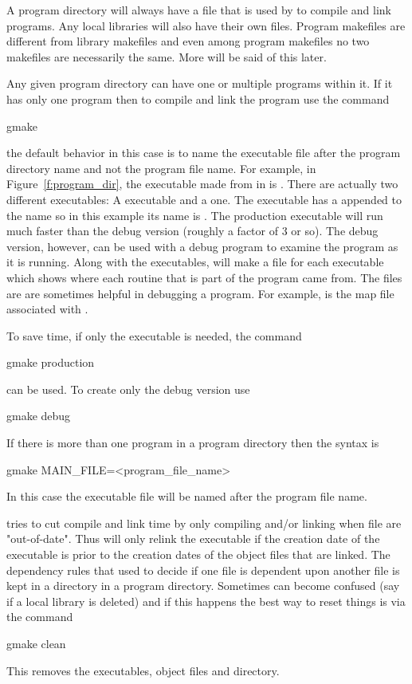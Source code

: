 A program directory will always have a  file that is used
by  to compile and link programs. Any local libraries will
also have their own  files. Program makefiles are
different from library makefiles and even among program makefiles no
two makefiles are necessarily the same. More will be said of this
later.

Any given program directory can have one or multiple programs within
it. If it has only one program then to compile and link the program
use the command
\begin{example}
  gmake
\end{example}
the default  behavior in this case is to name the executable
file after the program directory name and not the program file
name. For example, in Figure~\ref{f:program_dir}, the executable made from
 in  is . There
are actually two different executables: A  executable
and a  one. The  executable has a  appended
to the name so in this example its name is .
The production executable will run much faster than the debug version
(roughly a factor of 3 or so). The debug version, however, can be used
with a debug program to examine the program as it is running. Along
with the executables,  will make a  file for each
executable which shows where each routine that is part of the program
came from. The  files are are sometimes helpful in debugging
a program. For example,  is the map file
associated with .

To save time, if only the  executable is needed, the command
\begin{example}
  gmake production
\end{example}
can be used. To create only the debug version use
\begin{example}
  gmake debug
\end{example}
If there is more than one program in a program directory then the
 syntax is
\begin{example}
  gmake MAIN_FILE=<program_file_name>
\end{example}
In this case the executable file will be named after the program file
name.

 tries to cut compile and link time by only compiling and/or
linking when file are "out-of-date". Thus  will only relink
the executable if the creation date of the executable is prior to the
creation dates of the object files that are linked. The dependency
rules that  used to decide if one file is dependent upon
another file is kept in a  directory in a program
directory. Sometimes  can become confused (say if a local
library is deleted) and if this happens the best way to reset things
is via the command
\begin{example}
  gmake clean
\end{example}
This removes the executables, object files and  directory.

